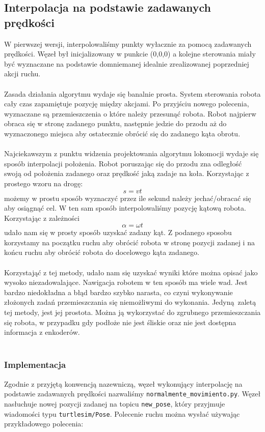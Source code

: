 \documentclass{mwrep}
\begin{document}
\subsection{Interpolacja na podstawie zadawanych prędkości}
\label{lab1_interpolation_noodom}
W pierwszej wersji, interpolowaliśmy punkty wyłacznie za pomocą 
zadawanych prędkości. Węzeł był inicjalizowany w punkcie (0,0,0) a kolejne sterowania
miały być wyznaczane na podstawie domniemanej idealnie zrealizowanej poprzedniej akcji ruchu.\\
\\
\indent{} Zasada działania algorytmu wydaje się banalnie prosta. System sterowania robota cały 
czas zapamiętuje pozycję między akcjami. Po przyjściu nowego polecenia, wyznaczane są 
przemieszczenia o które należy przesunąć robota. Robot najpierw obraca się w stronę zadanego
punktu, następnie jedzie do przodu aż do wyznaczonego miejsca aby ostatecznie obrócić się do 
zadanego kąta obrotu. \\
\\
\indent{} Najciekawszym z punktu widzenia projektowania algorytmu lokomocji wydaje się sposób interpolacji położenia.
Robot poruszając się do przodu zna odległość swoją od położenia zadanego oraz prędkość jaką zadaje
na koła. Korzystając z prostego wzoru na drogę: $$ s = vt $$ możemy w prostu sposób wyznaczyć
przez ile sekund należy jechać/obracać się aby osiągnąć cel. W ten sam sposób interpolowaliśmy
pozycję kątową robota. Korzystając z zależności $$ \alpha = \omega t $$ udało nam się w prosty
sposób uzyskać zadany kąt. Z podanego sposobu korzystamy na początku ruchu aby obrócić robota w
stronę pozycji zadanej i na końcu ruchu aby obrócić robota do docelowego kąta zadanego. \\
\\
\indent{} Korzystająć z tej metody, udało nam się uzyskać wyniki
które można opisać jako wysoko niezadowalające. Nawigacja robotem w ten sposób ma wiele wad.
Jest bardzo niedokładna a błąd bardzo szybko narasta, co czyni wykonywanie złożonych zadań
przemieszczania się niemożliwymi do wykonania. Jedyną zaletą tej metody, jest jej prostota.
Można ją wykorzystać do zgrubnego przemieszczania się robota, w przypadku gdy podłoże 
nie jest śliskie oraz nie jest dostępna informacja z enkoderów.\\
\\
\subsubsection{Implementacja}
Zgodnie z przyjętą konwencją nazewniczą, węzeł wykonujący interpolację na podstawie 
zadawanych prędkości nazwaliśmy \texttt{normalmente\_{}movimiento.py}. Węzeł nasłuchuje 
nowej pozycji zadanej na topicu \texttt{new\_{}pose}, który przyjmuje wiadomości
typu \texttt{turtlesim/Pose}. Polecenie ruchu można wysłać używając przykładowego polecenia:
\end{document}
